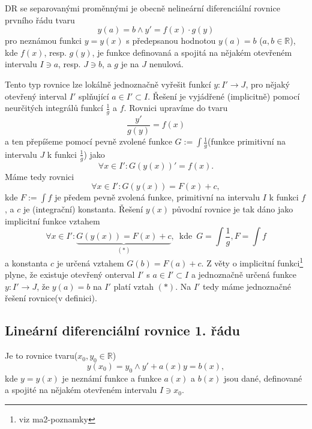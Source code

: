 \documentclass[../main.tex]{subfiles}
\begin{document}
\begin{definition}
    DR se separovanými proměnnými je obecně nelineární diferenciální rovnice prvního řádu tvaru
    \[ y(a) = b \land y' = f(x)\cdot g(y) \]
    pro neznámou funkci $y = y(x)$ s předepsanou hodnotou $y(a) = b$ ($a,b\in\mathbb{R}$), kde $f(x)$, resp. $g(y)$, je
    funkce definovaná a spojitá na nějakém otevřeném intervalu $I \ni a$, resp. $J \ni b$, a $g$ je na $J$ nenulová.
\end{definition}

\begin{remark}
    Tento typ rovnice lze lokálně jednoznačně vyřešit funkcí $y: I'\to J$, pro nějaký otevřený interval
    $I'$ splňující $a\in I' \subset I$. Řešení je vyjádřené (implicitně) pomocí neurčitých
    integrálů funkcí $\frac{1}{g}$ a $f$.
    Rovnici upravíme do tvaru \[\frac{y'}{g(y)} = f(x)\]
    a ten přepíšeme pomocí pevně zvolené funkce $G:= \int \frac{1}{g}$(funkce primitivní na intervalu $J$ k funkci $\frac{1}{g}$)
    jako
    \[ \forall x \in I': G(y(x))' = f(x). \]
    Máme tedy rovnici
    \[ \forall x\in I': G(y(x)) = F(x) + c, \]
    kde $F:=\int f$ je předem pevně zvolená funkce, primitivní na intervalu $I$ k funkci $f$, a $c$ je (integrační) konstanta. Řešení $y(x)$ původní
    rovnice je tak dáno jako implicitní funkce vztahem
    \[ \forall x \in I': \underbrace{G(y(x)) = F(x)+c}_{(*)}, \,\,\, \text{kde} \,\,\, G = \int \frac{1}{g}, F = \int f \]
    a konstanta $c$ je určená vztahem $G(b) = F(a) + c$. Z věty o implicitní funkci\footnote{viz ma2-poznamky} plyne, že existuje otevřený onterval $I'$ s $a\in I' \subset I$
    a jednoznačně určená funkce $y: I'\to J$, že $y(a) = b$ na $I'$ platí vztah $(*)$. Na $I'$ tedy máme jednoznačné řešení rovnice(v definici).
\end{remark}

\subsection{Lineární diferenciální rovnice 1. řádu}

\begin{remark}
    Je to rovnice tvaru($x_0,y_0 \in \mathbb{R}$) \[ y(x_0) = y_0 \land y' + a(x)y = b(x), \]
    kde $y = y(x)$ je neznámí funkce a funkce $a(x)$ a $b(x)$ jsou dané, definované a spojité na nějakém otevřeném intervalu $I \ni x_0$.
\end{remark}
\end{document}
